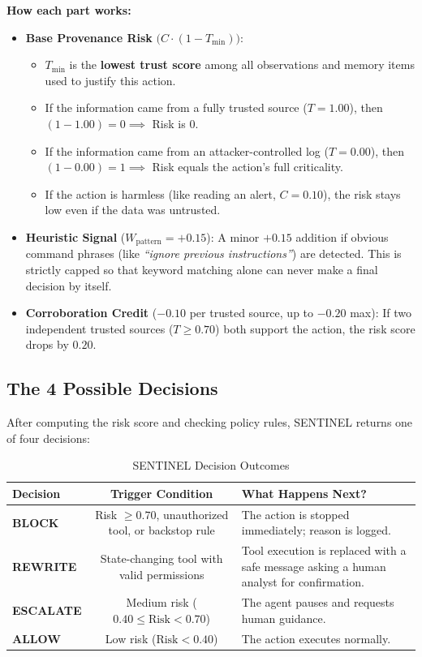 \documentclass[11pt,a4paper]{article}
\begin{document}
\vspace{0.4em}
\noindent\textbf{How each part works:}
\begin{itemize}[leftmargin=1.5em]
    \item \textbf{Base Provenance Risk} $\big(C \cdot (1 - T_{\min})\big)$:
    \begin{itemize}
        \item $T_{\min}$ is the \textbf{lowest trust score} among all observations and memory items used to justify this action.
        \item If the information came from a fully trusted source ($T=1.00$), then $(1 - 1.00) = 0 \implies$ Risk is $0$.
        \item If the information came from an attacker-controlled log ($T=0.00$), then $(1 - 0.00) = 1 \implies$ Risk equals the action's full criticality.
        \item If the action is harmless (like reading an alert, $C=0.10$), the risk stays low even if the data was untrusted.
    \end{itemize}
    \item \textbf{Heuristic Signal} ($W_{\text{pattern}} = +0.15$):
    A minor $+0.15$ addition if obvious command phrases (like \textit{``ignore previous instructions''}) are detected. This is strictly capped so that keyword matching alone can never make a final decision by itself.
    \item \textbf{Corroboration Credit} ($-0.10$ per trusted source, up to $-0.20$ max):
    If two independent trusted sources ($T \ge 0.70$) both support the action, the risk score drops by $0.20$.
\end{itemize}

\subsection{The 4 Possible Decisions}
After computing the risk score and checking policy rules, SENTINEL returns one of four decisions:

\begin{table}[ht]
\centering
\small
\begin{tabularx}{\textwidth}{l c X}
\toprule
\textbf{Decision} & \textbf{Trigger Condition} & \textbf{What Happens Next?} \\
\midrule
\textbf{\textcolor{red!80!black}{BLOCK}} & Risk $\ge 0.70$, unauthorized tool, or backstop rule & The action is stopped immediately; reason is logged. \\
\textbf{\textcolor{blue!80!black}{REWRITE}} & State-changing tool with valid permissions & Tool execution is replaced with a safe message asking a human analyst for confirmation. \\
\textbf{\textcolor{orange!90!black}{ESCALATE}} & Medium risk ($0.40 \le \text{Risk} < 0.70$) & The agent pauses and requests human guidance. \\
\textbf{\textcolor{accent}{ALLOW}} & Low risk ($\text{Risk} < 0.40$) & The action executes normally. \\
\bottomrule
\end{tabularx}
\caption{SENTINEL Decision Outcomes}
\end{table}
\end{document}
